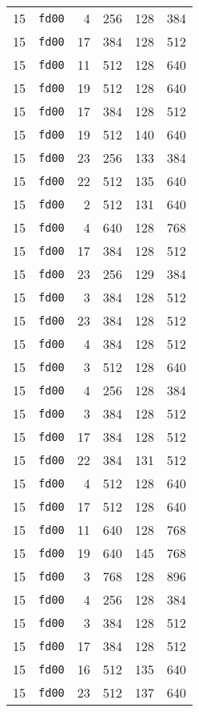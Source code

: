 \documentclass{article}
\begin{document}
\begin{table}[h!]
\begin{tabular}{llrrrl}
    15 & \texttt{fd00} & 4 & 256 & 128 & 384 \\
    15 & \texttt{fd00} & 17 & 384 & 128 & 512 \\
    15 & \texttt{fd00} & 11 & 512 & 128 & 640 \\
    15 & \texttt{fd00} & 19 & 512 & 128 & 640 \\
    15 & \texttt{fd00} & 17 & 384 & 128 & 512 \\
    15 & \texttt{fd00} & 19 & 512 & 140 & 640 \\
    15 & \texttt{fd00} & 23 & 256 & 133 & 384 \\
    15 & \texttt{fd00} & 22 & 512 & 135 & 640 \\
    15 & \texttt{fd00} & 2 & 512 & 131 & 640 \\
    15 & \texttt{fd00} & 4 & 640 & 128 & 768 \\
    15 & \texttt{fd00} & 17 & 384 & 128 & 512 \\
    15 & \texttt{fd00} & 23 & 256 & 129 & 384 \\
    15 & \texttt{fd00} & 3 & 384 & 128 & 512 \\
    15 & \texttt{fd00} & 23 & 384 & 128 & 512 \\
    15 & \texttt{fd00} & 4 & 384 & 128 & 512 \\
    15 & \texttt{fd00} & 3 & 512 & 128 & 640 \\
    15 & \texttt{fd00} & 4 & 256 & 128 & 384 \\
    15 & \texttt{fd00} & 3 & 384 & 128 & 512 \\
    15 & \texttt{fd00} & 17 & 384 & 128 & 512 \\
    15 & \texttt{fd00} & 22 & 384 & 131 & 512 \\
    15 & \texttt{fd00} & 4 & 512 & 128 & 640 \\
    15 & \texttt{fd00} & 17 & 512 & 128 & 640 \\
    15 & \texttt{fd00} & 11 & 640 & 128 & 768 \\
    15 & \texttt{fd00} & 19 & 640 & 145 & 768 \\
    15 & \texttt{fd00} & 3 & 768 & 128 & 896 \\
    15 & \texttt{fd00} & 4 & 256 & 128 & 384 \\
    15 & \texttt{fd00} & 3 & 384 & 128 & 512 \\
    15 & \texttt{fd00} & 17 & 384 & 128 & 512 \\
    15 & \texttt{fd00} & 16 & 512 & 135 & 640 \\
    15 & \texttt{fd00} & 23 & 512 & 137 & 640 \\

\end{tabular}
\end{table}
\end{document}

